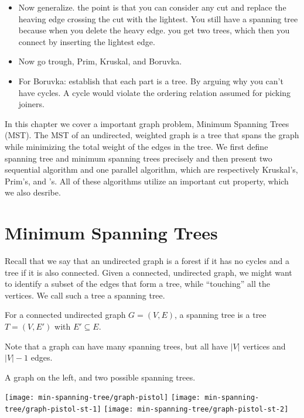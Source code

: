 \begin{notesonly}
\begin{itemize}
\item Now generalize.  the point is that you can consider any cut and
  replace the heaving edge crossing the cut with the lightest. You
  still have a spanning tree because when you delete the heavy edge.
  you get two trees, which then you connect by inserting the lightest
  edge. 


\item Now go trough, Prim, Kruskal, and Boruvka.


\item For Boruvka: establish that each part is a tree.  By arguing why
  you can't have cycles. A cycle would violate the ordering relation
  assumed for picking joiners.

\end{itemize}



\end{notesonly}

In this chapter we cover a important graph problem, Minimum Spanning
Trees (MST).  The MST of an undirected, weighted graph is a tree that
spans the graph while minimizing the total weight of the edges in the
tree.  We first define spanning tree and minimum spanning trees
precisely and then present two sequential algorithm and one parallel
algorithm, which are respectively Kruskal's, Prim's, and \boruvka's.
All of these algorithms utilize an important cut property, which we
also desribe.


\section{Minimum Spanning Trees}
\label{sec:mst::mst}
Recall that we say that an undirected graph is a forest if it has no
cycles and a tree if it is also connected. Given a connected,
undirected graph, we might want to identify a subset of the edges that
form a tree, while ``touching'' all the vertices.  We call such a tree
a spanning tree.
%
\begin{definition}
For a connected undirected graph $G = (V,E)$, a spanning tree is a
tree $T = (V,E')$ with $E' \subseteq E$.
\end{definition}
Note that a graph can have many spanning trees, but all have $|V|$
vertices and $|V|-1$ edges.

\begin{example}
A graph on the left, and two possible spanning trees.
\begin{center}
\texttt{[image: min-spanning-tree/graph-pistol]}
\hspace{.1in}
\texttt{[image: min-spanning-tree/graph-pistol-st-1]}
\hspace{.1in}
\texttt{[image: min-spanning-tree/graph-pistol-st-2]}
\end{center}
\end{example}


